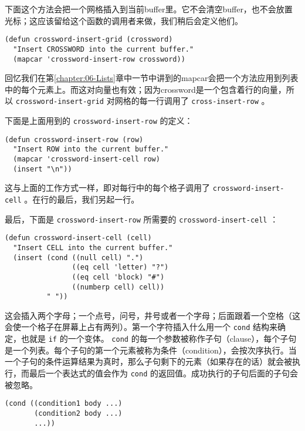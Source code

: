 下面这个方法会把一个网格插入到当前buffer里。它不会清空buffer，也不会放置光标；这应该留给这个函数的调用者来做，我们稍后会定义他们。

\begin{verbatim}
(defun crossword-insert-grid (crossword)
  "Insert CROSSWORD into the current buffer."
  (mapcar 'crossword-insert-row crossword))
\end{verbatim}

回忆我们在第\ref{chapter:06-Lists}章中一节中讲到的mapcar会把一个方法应用到列表中的每个元素上。而这对向量也有效；因为crossword是一个包含着行的向量，所以 \texttt{crossword-insert-grid} 对网格的每一行调用了 \texttt{cross-insert-row} 。

下面是上面用到的 \texttt{crossword-insert-row} 的定义：

\begin{verbatim}
(defun crossword-insert-row (row)
  "Insert ROW into the current buffer."
  (mapcar 'crossword-insert-cell row)
  (insert "\n"))
\end{verbatim}

这与上面的工作方式一样，即对每行中的每个格子调用了 \texttt{crossword-insert-cell} 。在行的最后，我们另起一行。

最后，下面是 \texttt{crossword-insert-row} 所需要的 \texttt{crossword-insert-cell} ：

\begin{verbatim}
(defun crossword-insert-cell (cell)
  "Insert CELL into the current buffer."
  (insert (cond ((null cell) ".")
                ((eq cell 'letter) "?")
                ((eq cell 'block) "#")
                ((numberp cell) cell))
          " "))
\end{verbatim}

这会插入两个字母；一个点号，问号，井号或者一个字母；后面跟着一个空格（这会使一个格子在屏幕上占有两列）。第一个字符插入什么用一个 \texttt{cond} 结构来确定，也就是 \texttt{if} 的一个变体。 \texttt{cond} 的每一个参数被称作子句（clause），每个子句是一个列表。每个子句的第一个元素被称为条件（condition），会按次序执行。当一个子句的条件运算结果为真时，那么子句剩下的元素（如果存在的话）就会被执行，而最后一个表达式的值会作为 \texttt{cond} 的返回值。成功执行的子句后面的子句会被忽略。

\begin{verbatim}
(cond ((condition1 body ...)
       (condition2 body ...)
       ...))
\end{verbatim}

